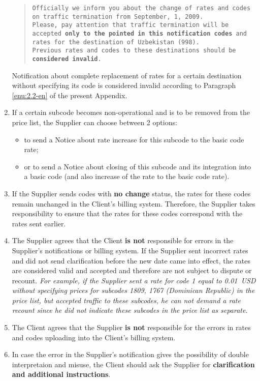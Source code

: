 \begin{Form}
\begin{enumerate}[label=\thesection.\arabic*.]
\begin{quote}
\begin{flushleft}
        \texttt{Officially we inform you about the change of rates and codes on traffic
        termination from September, 1, 2009.\\
        Please, pay attention that traffic termination will be accepted \textbf{only to
        the pointed in this notification codes} and rates for the destination of
        Uzbekistan (998).\\
        Previous rates and codes to these destinations should be \textbf{considered
        invalid}.}\\
    \end{flushleft}
  \end{quote}
  
    Notification about complete replacement of rates for a certain destination
    without specifying its code is considered invalid according to Paragraph \ref{enu:2.2-en}
    of the present Appendix. 

  \item If a certain subcode becomes non-op\-er\-at\-ion\-al and is to be removed from
    the price list, the Supplier can choose between 2 options: 
    \begin{itemize}
    \item to send a Notice about rate increase for this subcode to the basic code rate; 
    \item or to send a Notice about closing of this subcode and its integration into a
    basic code (and also increase of the rate to the basic code rate). 
    \end{itemize}

  \item If the Supplier sends codes with \textbf{\flqq{}no change\frqq{}} status,
    the rates for these codes remain unchanged in the Client's billing system. 
    Therefore, the Supplier takes responsibility to ensure that the rates for
    these codes correspond with the rates sent earlier.

  \item The Supplier agrees that the Client \textbf{is not} responsible for errors in
    the Supplier's notifications or billing system. If the Supplier sent 
    incorrect rates and did not send clarification before the new date came
    into effect, the rates are considered valid and accepted and therefore
    are not subject to dispute or recount.
    \textit{For example, if the Supplier sent a rate for code 1 equal to
    0.01~USD without specifying prices for subcodes 1809, 1767
    (Dominican Republic) in the price list, but accepted traffic to these subcodes,
    he can not demand a rate recount since he did not indicate these subcodes in
    the price list as separate}.
   \item The Client agrees that the Supplier \textbf{is not} responsible for the errors
    in rates and codes uploading into the Client's billing system.
  \item In case the error in the Supplier's notification gives the possibility
    of double interpretaion and misuse, the Client should ask the Supplier
    for \textbf{clarification and additional instructions}.


\end{enumerate}
\end{Form}

